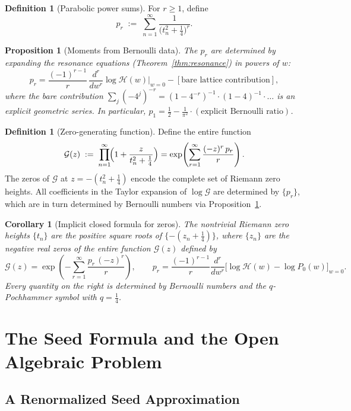 \documentclass[%
 aip,
 amsmath,amssymb,
 reprint,%
]{revtex4-1}
\theoremstyle{plain}
\newtheorem{proposition}[theorem]{Proposition}
\newtheorem{corollary}[theorem]{Corollary}
\theoremstyle{definition}
\newtheorem{definition}[theorem]{Definition}
\begin{document}
\begin{definition}[Parabolic power sums]
For $r\ge 1$, define
\[
p_r \;:=\; \sum_{n=1}^\infty \frac{1}{\bigl(t_n^2+\tfrac{1}{4}\bigr)^r}.
\]
\end{definition}

\begin{proposition}[Moments from Bernoulli data]\label{prop:moments}
The $p_r$ are determined by expanding the resonance equations
(Theorem~\ref{thm:resonance}) in powers of $w$:
\[
p_r = \frac{(-1)^{r-1}}{r}\,\frac{d^r}{dw^r}\log\mathcal{H}(w)\bigg|_{w=0}
- [\text{bare lattice contribution}],
\]
where the bare contribution $\sum_j (-4^j)^{-r}=(1-4^{-r})^{-1}\cdot
(1-4)^{-1}\cdot\ldots$ is an explicit geometric series.  In particular,
$p_1 = \tfrac{1}{2}-\tfrac{1}{\pi^2}\cdot(\text{explicit Bernoulli ratio})$.
\end{proposition}

\begin{definition}[Zero-generating function]\label{def:gen_fn}
Define the entire function
\[
\mathcal{G}(z) \;:=\; \prod_{n=1}^\infty\!\Bigl(1 + \frac{z}{t_n^2+\tfrac{1}{4}}\Bigr)
= \exp\!\left(\sum_{r=1}^\infty \frac{(-z)^r\,p_r}{r}\right).
\]
The zeros of $\mathcal{G}$ at $z = -(t_n^2+\tfrac{1}{4})$ encode the complete
set of Riemann zero heights.  All coefficients in the Taylor expansion of
$\log\mathcal{G}$ are determined by $\{p_r\}$, which are in turn determined by
Bernoulli numbers via Proposition~\ref{prop:moments}.
\end{definition}

\begin{corollary}[Implicit closed formula for zeros]\label{cor:implicit_formula}
The nontrivial Riemann zero heights $\{t_n\}$ are the positive square roots of
$\{-(z_n+\tfrac14)\}$, where $\{z_n\}$ are the negative real zeros of the entire
function $\mathcal{G}(z)$ defined by
\[
\mathcal{G}(z) = \exp\!\left(-\sum_{r=1}^\infty \frac{p_r\,(-z)^r}{r}\right),
\qquad
p_r = \frac{(-1)^{r-1}}{r}\frac{d^r}{dw^r}\bigl[\log\mathcal{H}(w)-\log P_0(w)\bigr]_{w=0}.
\]
Every quantity on the right is determined by Bernoulli numbers and the
$q$-Pochhammer symbol with $q=\tfrac{1}{4}$.
\end{corollary}

\section{The Seed Formula and the Open Algebraic Problem}

\subsection{A Renormalized Seed Approximation}
\end{document}
